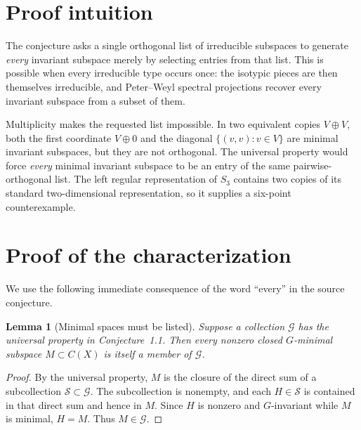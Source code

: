 \documentclass[11pt]{article}
\newtheorem{lemma}{Lemma}
\newcommand{\Gfam}{\mathscr G}
\begin{document}
\section{Proof intuition}

The conjecture asks a single orthogonal list of irreducible subspaces to
generate \emph{every} invariant subspace merely by selecting entries from
that list.  This is possible when every irreducible type occurs once: the
isotypic pieces are then themselves irreducible, and Peter--Weyl spectral
projections recover every invariant subspace from a subset of them.

Multiplicity makes the requested list impossible.  In two equivalent copies
$V\oplus V$, both the first coordinate $V\oplus0$ and the diagonal
$\{(v,v):v\in V\}$ are minimal invariant subspaces, but they are not
orthogonal.  The universal property would force \emph{every} minimal
invariant subspace to be an entry of the same pairwise-orthogonal list.  The
left regular representation of $S_3$ contains two copies of its standard
two-dimensional representation, so it supplies a six-point counterexample.

\section{Proof of the characterization}

We use the following immediate consequence of the word ``every'' in the
source conjecture.

\begin{lemma}[Minimal spaces must be listed]\label{lem:listed}
Suppose a collection $\Gfam$ has the universal property in Conjecture~1.1.
Then every nonzero closed $G$-minimal subspace $M\subset C(X)$ is itself a
member of $\Gfam$.
\end{lemma}

\begin{proof}
By the universal property, $M$ is the closure of the direct sum of a
subcollection $\mathscr S\subset\Gfam$.  The subcollection is nonempty, and
each $H\in\mathscr S$ is contained in that direct sum and hence in $M$.
Since $H$ is nonzero and $G$-invariant while $M$ is minimal, $H=M$.
Thus $M\in\Gfam$.
\end{proof}
\end{document}
